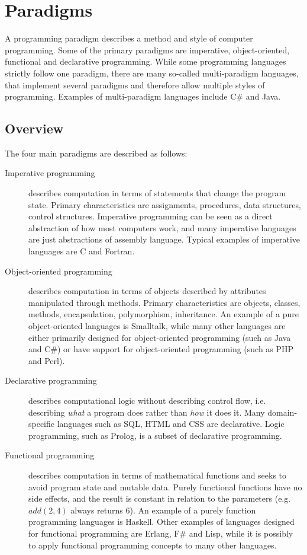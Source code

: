 \section{Paradigms}
\label{sec:paradigms}

A programming paradigm describes a method and style of computer programming.
Some of the primary paradigms are imperative, object-oriented, functional and declarative programming. While some programming languages strictly follow one paradigm, there are many so-called multi-paradigm languages, that implement several paradigms and therefore allow multiple styles of programming. Examples of multi-paradigm languages include C\# and Java.

\subsection{Overview}
The four main paradigms are described as follows:
\begin{description}
\item[Imperative programming] describes computation in terms of statements that change the program state. Primary characteristics are assignments, procedures, data structures, control structures. Imperative programming can be seen as a direct abstraction of how most computers work, and many imperative languages are just abstractions of assembly language. Typical examples of imperative languages are C and Fortran.
\item[Object-oriented programming] describes computation in terms of objects described by attributes manipulated through methods. Primary characteristics are objects, classes, methods, encapsulation, polymorphism, inheritance. An example of a pure object-oriented languages is Smalltalk, while many other languages are either primarily designed for object-oriented programming (such as Java and C\#) or have support for object-oriented programming (such as PHP and Perl).
\item[Declarative programming] describes computational logic without describing control flow, i.e. describing {\em what} a program does rather than {\em how} it does it. Many domain-specific languages such as SQL, HTML and CSS are declarative. Logic programming, such as Prolog, is a subset of declarative programming.
\item[Functional programming] describes computation in terms of mathematical functions and seeks to avoid program state and mutable data. Purely functional functions have no side effects, and the result is constant in relation to the parameters (e.g. $add(2, 4)$ always returns $6$). An example of a purely function programming languages is Haskell. Other examples of languages designed for functional programming are Erlang, F\# and Lisp, while it is possibly to apply functional programming concepts to many other languages.
\end{description}

